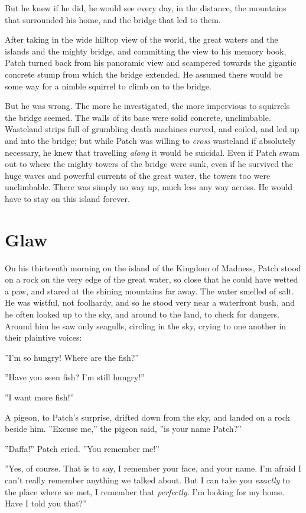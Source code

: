 \documentclass[12pt]{book}
\begin{document}
But he knew if he did, he would see every day, in the distance, the
mountains that surrounded his home, and the bridge that led to them.

After taking in the wide hilltop view of the world, the great waters
and the islands and the mighty bridge, and committing the view to his
memory book, Patch turned back from his panoramic view and scampered
towards the gigantic concrete stump from which the bridge extended. He
assumed there would be some way for a nimble squirrel to climb on to
the bridge.

But he was wrong. The more he investigated, the more impervious to
squirrels the bridge seemed. The walls of its base were solid
concrete, unclimbable. Wasteland strips full of grumbling death
machines curved, and coiled, and led up and into the bridge; but while
Patch was willing to \textit{cross} wasteland if absolutely necessary,
he knew that travelling \textit{along} it would be suicidal. Even if
Patch swam out to where the mighty towers of the bridge were sunk,
even if he survived the huge waves and powerful currents of the great
water, the towers too were unclimbable. There was simply no way up,
much less any way across. He would have to stay on this island
forever.


\section{Glaw}

On his thirteenth morning on the island of the Kingdom of Madness,
Patch stood on a rock on the very edge of the great water, so close
that he could have wetted a paw, and stared at the shining mountains
far away. The water smelled of salt. He was wistful, not foolhardy,
and so he stood very near a waterfront bush, and he often looked up to
the sky, and around to the land, to check for dangers. Around him he
saw only seagulls, circling in the sky, crying to one another in their
plaintive voices:

''I'm so hungry! Where are the fish?''

''Have you seen fish? I'm still hungry!''

''I want more fish!''

A pigeon, to Patch's surprise, drifted down from the sky, and landed
on a rock beside him. ''Excuse me,'' the pigeon said, ''is your name
Patch?''

''Daffa!'' Patch cried. ''You remember me!''

''Yes, of course. That is to say, I remember your face, and your
name. I'm afraid I can't really remember anything we talked about. But
I can take you \textit{exactly} to the place where we met, I remember
that \textit{perfectly.} I'm looking for my home. Have I told you
that?''
\end{document}
